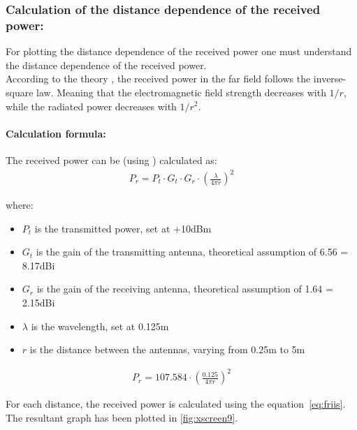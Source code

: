\subsubsection{\textbf{Calculation of the distance dependence of the received power:}}

For plotting the distance dependence of the received power one must understand the distance dependence of the received power. \\
According to the theory \cite{lec-script}, the received power in the far field follows the inverse-square law. Meaning that the electromagnetic field strength decreases with $1/r$, while the radiated power decreases with $1/r^2$.

\paragraph{Calculation formula:}
The received power can be (using \cite{friis-script}) calculated as:
\begin{gather}
	P_r = P_t \cdot G_t \cdot G_r \cdot \left(\frac{\lambda}{4\pi r}\right)^2 \label{eq:friis}
\end{gather}

where:
\begin{itemize}
	\item $P_t$ is the transmitted power, set at +10dBm
	\item $G_t$ is the gain of the transmitting antenna, theoretical assumption of 6.56 = 8.17dBi
	\item $G_r$ is the gain of the receiving antenna, theoretical assumption of 1.64 = 2.15dBi
	\item $\lambda$ is the wavelength, set at 0.125m
	\item $r$ is the distance between the antennas, varying from 0.25m to 5m
\end{itemize}

\begin{gather}
	P_r = 107.584 \cdot \left(\frac{0.125}{4\pi r}\right)^2 \nonumber
\end{gather}

For each distance, the received power is calculated using the equation~\ref{eq:friis}. \\
The resultant graph has been plotted in \ref{fig:xscreen9}.

